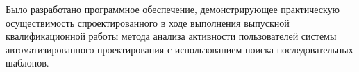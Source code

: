
Было разработано программное обеспечение, демонстрирующее практическую осуществимость спроектированного в ходе выполнения выпускной квалификационной работы метода анализа активности пользователей системы автоматизированного проектирования с использованием поиска последовательных шаблонов.